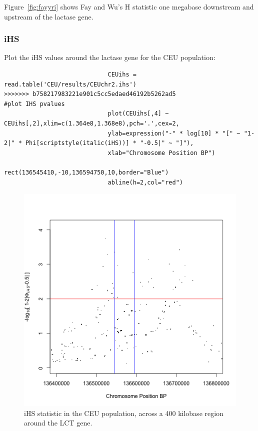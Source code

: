\documentclass[a4paper,10pt]{article}
\begin{document}
                             \noindent
                             Figure~\ref{fig:fayyri} shows Fay and Wu's H statistic one megabase
                             downstream and upstream of the lactase gene.

                             \subsubsection{iHS}
                             Plot the iHS values around the lactase gene for the CEU population:\\
                             \begin{verbatim}
                             CEUihs = read.table('CEU/results/CEUchr2.ihs')
>>>>>>> b758217983221e901c5cc5edaed46192b5262ad5
#plot IHS pvalues
                             plot(CEUihs[,4] ~ CEUihs[,2],xlim=c(1.364e8,1.368e8),pch='.',cex=2,
                             ylab=expression("-" * log[10] * "[" ~ "1-2|" * Phi[scriptstyle(italic(iHS))] * "-0.5|" ~ "]"),
                             xlab="Chromosome Position BP") 
                             rect(136545410,-10,136594750,10,border="Blue") 
                             abline(h=2,col="red")
                             \end{verbatim}

                             \begin{figure}
                             \centering
                             \includegraphics{pictures/CEUihs.png}
                             \caption{iHS statistic in the CEU population, across a 400 kilobase region around the LCT gene. }  
                             \label{fig:ceuihs}
                             \end{figure}
\end{document}
